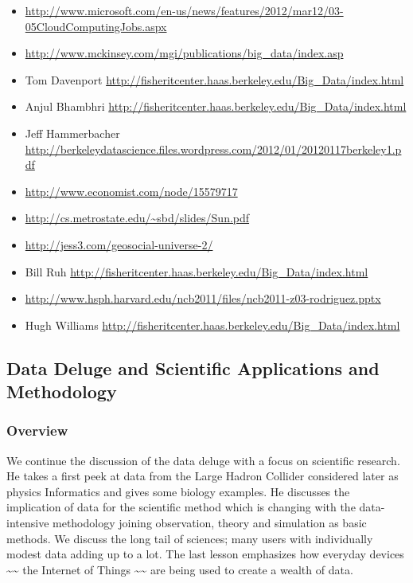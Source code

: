 \begin{itemize}
\item
  \url{http://www.microsoft.com/en-us/news/features/2012/mar12/03-05CloudComputingJobs.aspx}
\item
  \url{http://www.mckinsey.com/mgi/publications/big_data/index.asp}
\item
  Tom Davenport
  \url{http://fisheritcenter.haas.berkeley.edu/Big_Data/index.html}
\item
  Anjul Bhambhri
  \url{http://fisheritcenter.haas.berkeley.edu/Big_Data/index.html}
\item
  Jeff Hammerbacher
  \url{http://berkeleydatascience.files.wordpress.com/2012/01/20120117berkeley1.pdf}
\item
  \url{http://www.economist.com/node/15579717}
\item
  \url{http://cs.metrostate.edu/~sbd/slides/Sun.pdf}
\item
  \url{http://jess3.com/geosocial-universe-2/}
\item
  Bill Ruh \url{http://fisheritcenter.haas.berkeley.edu/Big\_Data/index.html}
\item
  \url{http://www.hsph.harvard.edu/ncb2011/files/ncb2011-z03-rodriguez.pptx}
\item
  Hugh Williams
  \url{http://fisheritcenter.haas.berkeley.edu/Big_Data/index.html}
\end{itemize}

\subsection{Data Deluge and Scientific Applications and
Methodology}\label{data-deluge-and-scientific-applications-and-methodology}

\subsubsection{Overview}\label{overview}

We continue the discussion of the data deluge with a focus on scientific
research. He takes a first peek at data from the Large Hadron Collider
considered later as physics Informatics and gives some biology examples.
He discusses the implication of data for the scientific method which is
changing with the data-intensive methodology joining observation, theory
and simulation as basic methods. We discuss the long tail of sciences;
many users with individually modest data adding up to a lot. The last
lesson emphasizes how everyday devices
\textasciitilde{}\textasciitilde{} the Internet of Things
\textasciitilde{}\textasciitilde{} are being used to create a wealth of
data.

